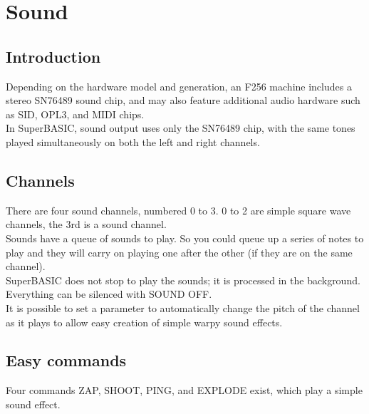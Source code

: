 \chapter{Sound}

\section{Introduction}

Depending on the hardware model and generation, an F256 machine includes a stereo SN76489 sound chip, and may also feature additional audio hardware such as SID, OPL3, and MIDI chips.\\

In SuperBASIC, sound output uses only the SN76489 chip, with the same tones played simultaneously on both the left and right channels.

\section{Channels}

There are four sound channels, numbered 0 to 3. 0 to 2 are simple square wave channels, the 3rd is a sound channel.\\

Sounds have a queue of sounds to play. So you could queue up a series of notes to play and they will carry on playing one after the other (if they are on the same channel).\\

SuperBASIC does not stop to play the sounds; it is processed in the background. Everything can be silenced with SOUND OFF.\\

It is possible to set a parameter to automatically change the pitch of the channel as it plays to allow easy creation of simple warpy sound effects.

\section{Easy commands}

Four commands ZAP, SHOOT, PING, and EXPLODE exist, which play a simple sound effect.




